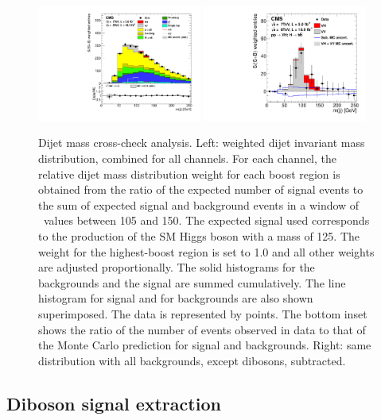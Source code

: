 \documentclass[12pt,twoside,a4paper,cmspaper,final,collab]{cms-tdr}
\begin{document}
\begin{figure}[htbp]
  \begin{center}
   \includegraphics[width=0.48\textwidth]{PRD_MJJ_combined_MJJ}
   \includegraphics[width=0.48\textwidth]{MJJ_subtracted_NewAspectRatio_Sept11}
\caption{Dijet mass cross-check analysis. Left: weighted dijet invariant mass distribution, combined for all
channels. For each channel, the relative dijet mass distribution weight
for each boost region is obtained from the ratio of the expected number of
signal events to the sum of expected signal and background events in a
window of \Mjj\ values between 105 and 150\GeV. The expected signal
used corresponds to the production of the SM Higgs boson with a mass of 125\GeV. The weight for the
highest-boost region is set to 1.0 and all other weights are adjusted
proportionally. The solid histograms for the
backgrounds and the signal are summed cumulatively. The line histogram for
signal and for {\Vvar}{\Vvar} backgrounds are also shown superimposed. The data is
represented by points. The bottom inset shows the ratio of the number of events observed in data to that
of the Monte Carlo prediction for signal and backgrounds. Right: same distribution with all backgrounds, except
dibosons, subtracted.}
    \label{fig:MJJ-combined}
  \end{center}
\end{figure}


\subsection{Diboson signal extraction}
\end{document}
